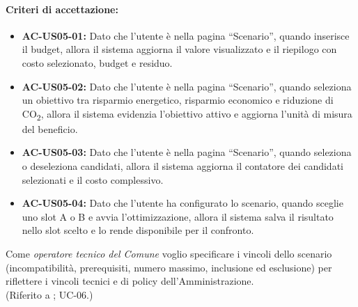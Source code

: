 \paragraph{Criteri di accettazione:}
\begin{itemize}[leftmargin=1.4em]
    \item \textbf{AC-US05-01:} Dato che l'utente è nella pagina ``Scenario'', quando inserisce il budget, allora il sistema aggiorna il valore visualizzato e il riepilogo con costo selezionato, budget e residuo.
    \item \textbf{AC-US05-02:} Dato che l'utente è nella pagina ``Scenario'', quando seleziona un obiettivo tra risparmio energetico, risparmio economico e riduzione di CO\textsubscript{2}, allora il sistema evidenzia l'obiettivo attivo e aggiorna l'unità di misura del beneficio.
    \item \textbf{AC-US05-03:} Dato che l'utente è nella pagina ``Scenario'', quando seleziona o deseleziona candidati, allora il sistema aggiorna il contatore dei candidati selezionati e il costo complessivo.
    \item \textbf{AC-US05-04:} Dato che l'utente ha configurato lo scenario, quando sceglie uno slot A o B e avvia l'ottimizzazione, allora il sistema salva il risultato nello slot scelto e lo rende disponibile per il confronto.
\end{itemize}

 \label{us:vincoli}
Come \textit{operatore tecnico del Comune} voglio specificare i vincoli dello scenario (incompatibilità, prerequisiti, numero massimo, inclusione ed esclusione) per riflettere i vincoli tecnici e di policy dell'Amministrazione. \\ (Riferito a ; UC-06.)

